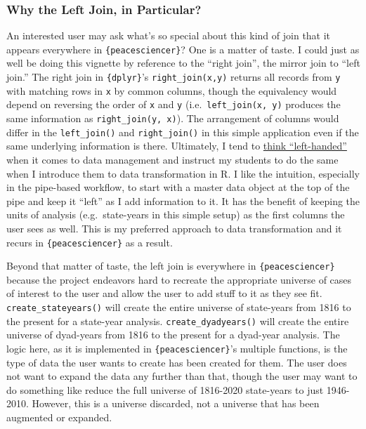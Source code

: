 \documentclass[
  11pt,
]{article}
\begin{document}
\hypertarget{why-the-left-join-in-particular}{%
\subsubsection{Why the Left Join, in Particular?}\label{why-the-left-join-in-particular}}

An interested user may ask what's so special about this kind of join that it appears everywhere in \texttt{\{peacesciencer\}}? One is a matter of taste. I could just as well be doing this vignette by reference to the ``right join'', the mirror join to ``left join.'' The right join in \texttt{\{dplyr\}}'s \texttt{right\_join(x,y)} returns all records from \texttt{y} with matching rows in \texttt{x} by common columns, though the equivalency would depend on reversing the order of \texttt{x} and \texttt{y} (i.e.~\texttt{left\_join(x,\ y)} produces the same information as \texttt{right\_join(y,\ x)}). The arrangement of columns would differ in the \texttt{left\_join()} and \texttt{right\_join()} in this simple application even if the same underlying information is there. Ultimately, I tend to \href{http://svmiller.com/blog/2021/01/a-tutorial-on-the-join-family-in-r/\#myadvice}{think ``left-handed''} when it comes to data management and instruct my students to do the same when I introduce them to data transformation in R. I like the intuition, especially in the pipe-based workflow, to start with a master data object at the top of the pipe and keep it ``left'' as I add information to it. It has the benefit of keeping the units of analysis (e.g.~state-years in this simple setup) as the first columns the user sees as well. This is my preferred approach to data transformation and it recurs in \texttt{\{peacesciencer\}} as a result.

Beyond that matter of taste, the left join is everywhere in \texttt{\{peacesciencer\}} because the project endeavors hard to recreate the appropriate universe of cases of interest to the user and allow the user to add stuff to it as they see fit. \texttt{create\_stateyears()} will create the entire universe of state-years from 1816 to the present for a state-year analysis. \texttt{create\_dyadyears()} will create the entire universe of dyad-years from 1816 to the present for a dyad-year analysis. The logic here, as it is implemented in \texttt{\{peacesciencer\}}'s multiple functions, is the type of data the user wants to create has been created for them. The user does not want to expand the data any further than that, though the user may want to do something like reduce the full universe of 1816-2020 state-years to just 1946-2010. However, this is a universe discarded, not a universe that has been augmented or expanded.
\end{document}
